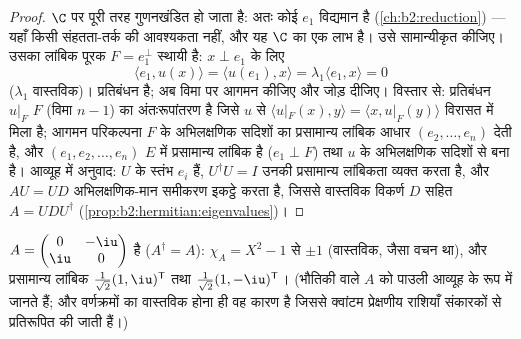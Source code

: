 \begin{proof}
$\C$ पर  पूरी तरह गुणनखंडित हो जाता है: अतः कोई
 $e_1$ विद्यमान है (\cref{ch:b2:reduction}) --- यहाँ किसी संहतता-तर्क की
आवश्यकता नहीं, और यह $\C$ का एक लाभ है। उसे सामान्यीकृत कीजिए। उसका लांबिक
पूरक $F = e_1^\perp$ स्थायी है: $x \perp e_1$ के लिए
\[
\langle e_1, u(x)\rangle = \langle u(e_1), x\rangle
= \lambda_1\langle e_1, x\rangle = 0
\]
($\lambda_1$ वास्तविक)। प्रतिबंधन  है; अब विमा पर आगमन कीजिए और जोड़
दीजिए। विस्तार से: प्रतिबंधन $u|_F$  $F$ (विमा $n - 1$) का
अंतःरूपांतरण है जिसे $u$ से $\langle u|_F(x), y\rangle = \langle x, u|_F(y)\rangle$ विरासत में मिला है; आगमन परिकल्पना $F$
के अभिलक्षणिक सदिशों का प्रसामान्य लांबिक आधार $(e_2, \dots, e_n)$ देती है, और $(e_1, e_2, \dots, e_n)$ $E$
में प्रसामान्य लांबिक है ($e_1 \perp
F$) तथा $u$ के अभिलक्षणिक सदिशों से बना है।
आव्यूह में अनुवाद: $U$ के स्तंभ $e_i$ हैं, $U^\dagger U = I$ उनकी प्रसामान्य लांबिकता
व्यक्त करता है, और $AU = UD$ अभिलक्षणिक-मान समीकरण इकट्ठे करता है, जिससे
वास्तविक विकर्ण $D$ सहित $A = UDU^\dagger$ (\cref{prop:b2:hermitian:eigenvalues})।
\end{proof}

\begin{example}\label{ex:b2:hermitian:pauli}
$A = \begin{pmatrix} 0 & -\iu\\ \iu & 0\end{pmatrix}$  है ($A^\dagger = A$): $\chi_A = X^2 - 1$ से  $\pm 1$ (वास्तविक, जैसा वचन
था), और प्रसामान्य लांबिक  $\frac{1}{\sqrt2}(1, \iu)^{\mathsf T}$ तथा $\frac{1}{\sqrt2}(1,
-\iu)^{\mathsf T}$। (भौतिकी वाले $A$
को पाउली आव्यूह के रूप में जानते हैं; और  वर्णक्रमों का वास्तविक
होना ही वह कारण है जिससे क्वांटम प्रेक्षणीय राशियाँ  संकारकों से
प्रतिरूपित की जाती हैं।)
\end{example}

